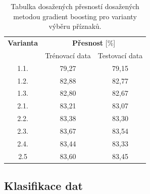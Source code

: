 \begin{table}[hbtp!]
    \centering
    \captionsetup{justification=centering}
    \caption{Tabulka dosažených přesností dosažených metodou gradient boosting pro varianty výběru příznaků.}
    \begin{tabular}{ccc}
    \multicolumn{1}{c}{\textbf{Varianta}} & \multicolumn{2}{c}{\textbf{Přesnost} {[}\%{]}} \\
    \multicolumn{1}{c}{} & \multicolumn{1}{c}{Trénovací data} & \multicolumn{1}{c}{Testovací data} \\
    \hline
    1.1. & 79{,}27                & 79{,}15\\
    1.2. & 82{,}88                & 82{,}77\\
    1.3. & 82{,}80                & 82{,}67\\
    2.1. & 83{,}21                & 83{,}07\\
    2.2. & 83{,}38                & 83{,}30\\
    2.3. & 83{,}67                & 83{,}54\\
    2.4. & 83{,}44                & 83{,}33    \\
    2.5 & 83,60&                    83,45      
    \end{tabular}
    \label{tab:acc-gb}
    \end{table}

\subsection{Klasifikace dat}





